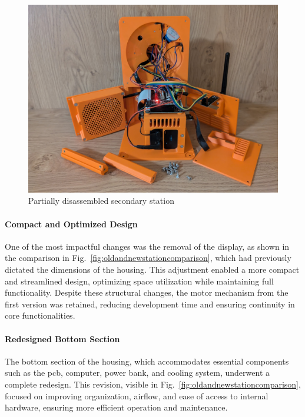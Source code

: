 \begin{figure}[H]
	\centering
	\includegraphics[width=1.0\linewidth]{figures/open_station}
	\caption{Partially disassembled secondary station}
	\label{fig:openstation}
\end{figure}


\paragraph{Compact and Optimized Design}
One of the most impactful changes was the removal of the display, as shown in the comparison in Fig.~\ref{fig:oldandnewstationcomparison}, which had previously dictated the dimensions of the housing. This adjustment enabled a more compact and streamlined design, optimizing space utilization while maintaining full functionality. Despite these structural changes, the motor mechanism from the first version was retained, reducing development time and ensuring continuity in core functionalities.  

\paragraph{Redesigned Bottom Section}  
The bottom section of the housing, which accommodates essential components such as the \acrshort{pcb}, computer, power bank, and cooling system, underwent a complete redesign. This revision, visible in Fig.~\ref{fig:oldandnewstationcomparison}, focused on improving organization, airflow, and ease of access to internal hardware, ensuring more efficient operation and maintenance.  

